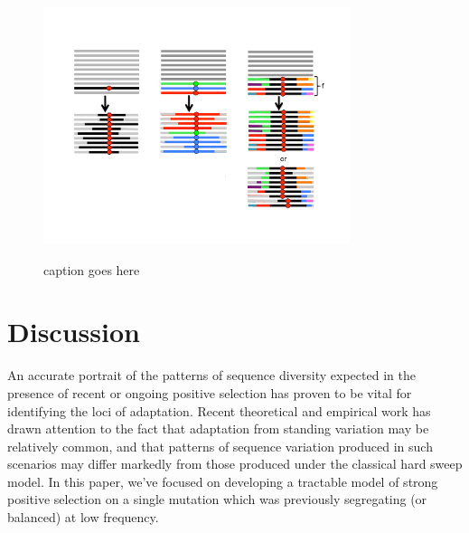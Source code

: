 \documentclass[a4paper,10pt]{article}
\newcommand{\gc}[1]{{\it \color{red} (#1)} }
\begin{document}
\begin{figure}
	\includegraphics[width = 0.8\textwidth]{../Paper_Figures/three_kinds_of_sweep.pdf} \label{cartoon_3_kinds}
	\caption{caption goes here}
\end{figure}

%
%
%
%
%

\section{Discussion}

An accurate portrait of the patterns of sequence diversity expected in the presence of recent or ongoing positive selection has proven to be vital for identifying the loci of adaptation. Recent theoretical and empirical work has drawn attention to the fact that adaptation from standing variation may be relatively common, and that patterns of sequence variation produced in such scenarios may differ markedly from those produced under the classical hard sweep model. In this paper, we've focused on developing a tractable model of strong positive selection on a single mutation which was previously segregating (or balanced) at low frequency. 
\end{document}
